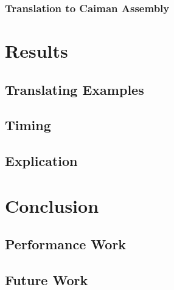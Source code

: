 \subsubsection{Translation to Caiman Assembly}

\section{Results}

\subsection{Translating Examples}

\subsection{Timing}

\subsection{Explication}

\section{Conclusion}

\subsection{Performance Work}

\subsection{Future Work}